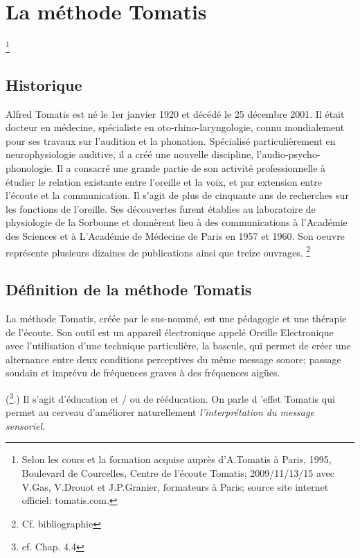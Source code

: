 \chapter{La méthode Tomatis}\footnote{Selon les cours et la formation acquise auprès d'A.Tomatis à Paris, 1995, Boulevard de Courcelles, Centre de l'écoute Tomatis;  2009/11/13/15 avec V.Gas, V.Drouot et J.P.Granier, formateurs à Paris; source site internet officiel: tomatis.com.}


\section{Historique} 

Alfred Tomatis est né le 1er janvier 1920 et décédé le 25 décembre
2001. Il était docteur en médecine, spécialiste en oto-rhino-laryngologie,
connu mondialement pour ses travaux sur l'audition et la phonation.
Spécialisé particulièrement en neurophysiologie auditive, il a créé
une nouvelle discipline, l'audio-psycho-phonologie. Il a consacré
une grande partie de son activité professionnelle à étudier le relation
existante entre l'oreille et la voix, et par extension entre l'écoute
et la communication. Il s'agit de plus de cinquante ans de recherches
sur les fonctions de l'oreille. Ses découvertes furent établies au
laboratoire de physiologie de la Sorbonne et donnèrent lieu à des
communications à l'Académie des Sciences et à L'Académie de Médecine
de Paris en 1957 et 1960. Son oeuvre représente plusieurs dizaines
de publications ainsi que treize ouvrages. \footnote{Cf. bibliographie}

\section{Définition de la méthode Tomatis} %



La méthode Tomatis, créée par le sus-nommé, est une pédagogie et une
thérapie de l'écoute. Son outil est un appareil électronique appelé
Oreille Electronique avec  l'utilisation d'une technique particulière, la bascule, qui permet de créer une alternance entre deux conditions perceptives du même message sonore; passage soudain et imprévu de fréquences graves à des fréquences aigües.

(\footnote{cf. Chap. 4.4}.) %
Il s'agit d'éducation
et / ou de rééducation. On parle d 'effet Tomatis qui permet au
cerveau d'améliorer naturellement \emph{l'interprétation du message
sensoriel.}


